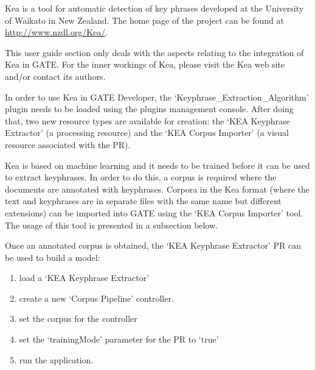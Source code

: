 

Kea is a tool for automatic detection of key phrases developed at
the University of Waikato in New Zealand. The home page of the project can be
found at \url{http://www.nzdl.org/Kea/}.

This user guide section only deals with the aspects relating to the integration
of Kea in GATE. For the inner workings of Kea, please visit the Kea web site
and/or contact its authors.

In order to use Kea in GATE Developer, the `Keyphrase\_Extraction\_Algorithm'
plugin needs to be loaded using the plugins management console. After doing that,
two new resource types are available for creation: the `KEA Keyphrase
Extractor' (a processing resource) and the `KEA Corpus Importer' (a visual
resource associated with the PR).


Kea is based on machine learning and it needs to be trained before it can be
used to extract keyphrases. In order to do this, a corpus is required where the
documents are annotated with keyphrases. Corpora in the Kea format (where the
text and keyphrases are in separate files with the same name but different
extensions) can be imported into GATE using the `KEA Corpus Importer' tool.
The usage of this tool is presented in a subsection below.

Once an annotated corpus is obtained, the `KEA Keyphrase Extractor' PR can be
used to build a model:
\begin{enumerate}
\item load a `KEA Keyphrase Extractor'
\item create a new `Corpus Pipeline' controller.
\item set the corpus for the controller
\item set the `trainingMode' parameter for the PR to `true'
\item run the application.
\end{enumerate}

